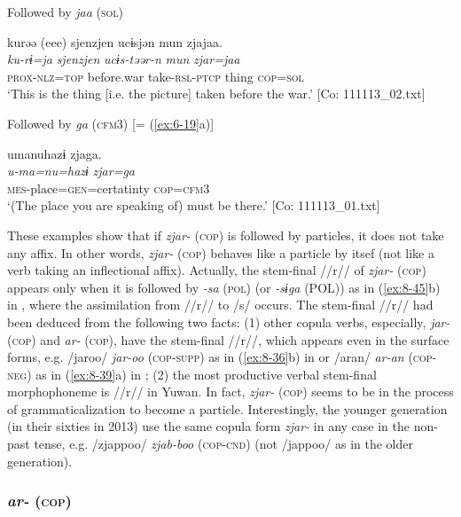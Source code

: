     \ex Followed by \textit{jaa} (\textsc{sol})

    {\TM}
    \glll  kurəə  (eee)  sjenzjen  ucɨsjən  mun  zjajaa.\\
    \textit{ku-rɨ=ja}    \textit{sjenzjen}  \textit{ucɨs-təər-n}  \textit{mun}  \textit{zjar=jaa}\\
    \textsc{prox}-\textsc{nlz}=\textsc{top}    before.war  take-\textsc{rsl}-\textsc{ptcp}  thing  \textsc{cop}=\textsc{sol}\\
    \glt ‘This is the thing [i.e. the picture] taken before the war.’ [Co: 111113\_02.txt]

    \ex Followed by \textit{ga} (\textsc{cfm3}) [= (\ref{ex:6-19}a)]

    {\TM}
    \glll  umanuhazɨ  zjaga.\\
    \textit{u-ma=nu=hazɨ}  \textit{zjar=ga}\\
        \textsc{mes}-place=\textsc{gen}=certatinty  \textsc{cop}=\textsc{cfm3}\\
    \glt ‘(The place you are speaking of) must be there.’ [Co: 111113\_01.txt]
    \z
\z

These examples show that if \textit{zjar-} (\textsc{cop}) is followed by particles, it does not take any affix. In other words, \textit{zjar-} (\textsc{cop}) behaves like a particle by itsef (not like a verb taking an inflectional affix). Actually, the stem-final //r// of \textit{zjar-} (\textsc{cop}) appears only when it is followed by \textit{-sa} (\textsc{pol}) (or \textit{-sɨga} (POL)) as in (\ref{ex:8-45}b) in , where the assimilation from //r// to /s/ occurs. The stem-final //r// had been deduced from the following two facts: (1) other copula verbs, especially, \textit{jar-} (\textsc{cop}) and \textit{ar-} (\textsc{cop}), have the stem-final //r//, which appears even in the surface forms, e.g. /jaroo/ \textit{jar-oo} (\textsc{cop}-\textsc{supp}) as in (\ref{ex:8-36}b) in  or /aran/ \textit{ar-an} (\textsc{cop}-\textsc{neg}) as in (\ref{ex:8-39}a) in ; (2) the most productive verbal stem-final morphophoneme is //r// in Yuwan. In fact, \textit{zjar-} (\textsc{cop}) seems to be in the process of grammaticalization to become a particle. Interestingly, the younger generation (in their sixties in 2013) use the same copula form \textit{zjar-} in any case in the non-past tense, e.g. /zjappoo/ \textit{zjab-boo} (\textsc{cop}-\textsc{cnd}) (not /jappoo/ as in the older generation).

\subsubsection{\textit{ar-} (\textsc{cop})}

